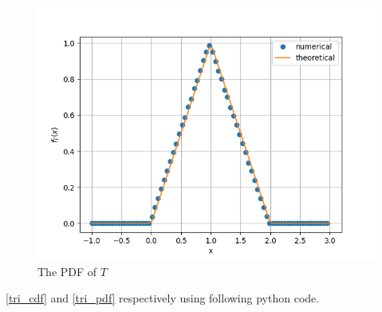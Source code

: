 \documentclass[journal,12pt,twocolumn]{IEEEtran}
\renewcommand\thesection{\arabic{section}}
\theoremstyle{remark}
\numberwithin{equation}{section}
\begin{document}
\begin{enumerate}[label=\thesection.\arabic*
,ref=\thesection.\theenumi]
\begin{figure}
	\centering
		\includegraphics[width=\columnwidth]{./ques_4/tri_pdf.png}
	\caption{The PDF of $T$}
	\label{tri_pdf}
\end{figure}
\eqref{tri_cdf} and \eqref{tri_pdf} respectively using following python code.
\end{enumerate}
\end{document}
